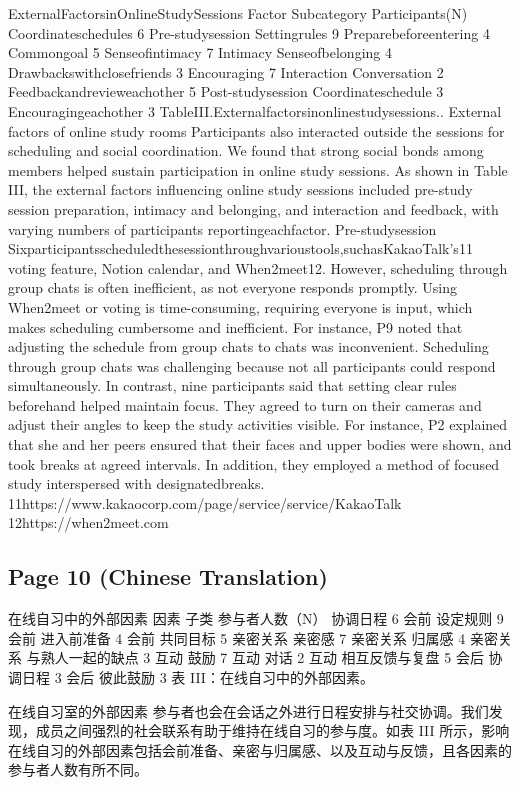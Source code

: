 \documentclass[12pt]{ctexart}
\begin{document}
ExternalFactorsinOnlineStudySessions
Factor Subcategory Participants(N)
Coordinateschedules 6
Pre-studysession Settingrules 9
Preparebeforeentering 4
Commongoal 5
Senseofintimacy 7
Intimacy
Senseofbelonging 4
Drawbackswithclosefriends 3
Encouraging 7
Interaction
Conversation 2
Feedbackandrevieweachother 5
Post-studysession Coordinateschedule 3
Encouragingeachother 3
TableIII.Externalfactorsinonlinestudysessions..
External factors of online study rooms
Participants also interacted outside the sessions for scheduling and social
coordination. We found that strong social bonds among members helped sustain
participation in online study sessions. As shown in Table III, the external factors
influencing online study sessions included pre-study session preparation, intimacy
and belonging, and interaction and feedback, with varying numbers of participants
reportingeachfactor.
Pre-studysession
Sixparticipantsscheduledthesessionthroughvarioustools,suchasKakaoTalk’s11
voting feature, Notion calendar, and When2meet12. However, scheduling through
group chats is often inefficient, as not everyone responds promptly. Using
When2meet or voting is time-consuming, requiring everyone is input, which
makes scheduling cumbersome and inefficient. For instance, P9 noted that
adjusting the schedule from group chats to chats was inconvenient. Scheduling
through group chats was challenging because not all participants could respond
simultaneously.
In contrast, nine participants said that setting clear rules beforehand helped
maintain focus. They agreed to turn on their cameras and adjust their angles to
keep the study activities visible. For instance, P2 explained that she and her peers
ensured that their faces and upper bodies were shown, and took breaks at agreed
intervals. In addition, they employed a method of focused study interspersed with
designatedbreaks.
11https://www.kakaocorp.com/page/service/service/KakaoTalk
12https://when2meet.com

\subsection*{Page 10 (Chinese Translation)}

在线自习中的外部因素
因素  子类  参与者人数（N）
协调日程  6
会前  设定规则  9
会前  进入前准备  4
会前  共同目标  5
亲密关系  亲密感  7
亲密关系  归属感  4
亲密关系  与熟人一起的缺点  3
互动  鼓励  7
互动  对话  2
互动  相互反馈与复盘  5
会后  协调日程  3
会后  彼此鼓励  3
表 III：在线自习中的外部因素。

在线自习室的外部因素
参与者也会在会话之外进行日程安排与社交协调。我们发现，成员之间强烈的社会联系有助于维持在线自习的参与度。如表 III 所示，影响在线自习的外部因素包括会前准备、亲密与归属感、以及互动与反馈，且各因素的参与者人数有所不同。
\end{document}
